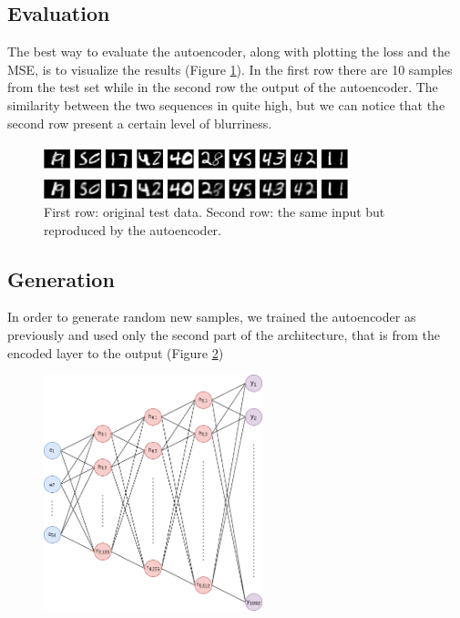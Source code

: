 \documentclass[compsoc]{IEEEtran}
\begin{document}
\subsection{Evaluation}
The best way to evaluate the autoencoder, along with plotting the loss and the MSE, is to visualize the results (Figure \ref{fig:reproduce}). In the first row
there are 10 samples from the test set while in the second row the output of the autoencoder. The similarity between the two sequences in quite high, but we
can notice that the second row present a certain level of blurriness.


\begin{figure}[ht!]
\centering                                                                        
\includegraphics[width=3.5in]{reproduce.png}
\captionsetup{justification=centering}
\caption{First row: original test data. Second row: the same input but reproduced by the autoencoder.}
\label{fig:reproduce}
\end{figure}

\subsection{Generation}
In order to generate random new samples, we trained the autoencoder as previously and used only the second part of the architecture, that is 
from the encoded layer to the output (Figure \ref{fig:generator})


\begin{figure}[ht!]
\centering                                                                        
\includegraphics[width=2.5in]{generator.png}
\captionsetup{justification=centering}
\caption{}
\label{fig:generator}
\end{figure}
\end{document}
